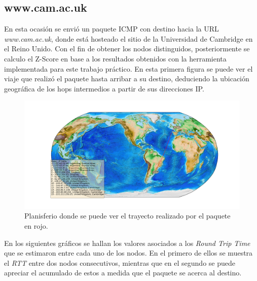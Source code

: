 \subsection{www.cam.ac.uk}

En esta ocasión se envió un paquete ICMP con destino hacia la URL \textit{www.cam.ac.uk}, donde está hosteado el sitio de la Universidad de Cambridge en el Reino Unido. Con el fin de obtener los nodos distinguidos, posteriormente se calculo el Z-Score en base a los resultados obtenidos con la herramienta implementada para este trabajo práctico.
En esta primera figura se puede ver el viaje que realizó el paquete hasta arribar a su destino, deduciendo la ubicación geográfica de los hops intermedios a partir de sus direcciones IP.

\begin{figure}[H]
  \centering	
	\includegraphics[scale=0.3]{../cambridge-experiment/figure_1.png}
  \caption{Planisferio donde se puede ver el trayecto realizado por el paquete en rojo.}
	\label{fig:histo-src-sitiotrabajo}
\end{figure}

En los siguientes gráficos se hallan los valores asociados a los \textit{Round Trip Time} que se estimaron entre cada uno de los nodos. En el primero de ellos se muestra el \textit{RTT} entre dos nodos consecutivos, mientras que en el segundo se puede apreciar el acumulado de estos a medida que el paquete se acerca al destino.

